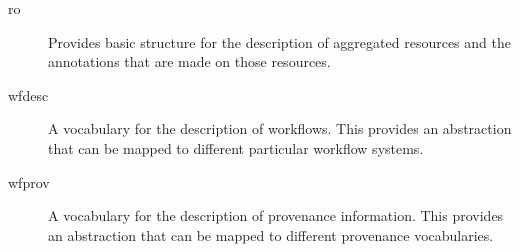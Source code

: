 \begin{description}
\item[ro] Provides basic structure for the description of aggregated
  resources and the annotations that are made on those resources.
\item[wfdesc] A vocabulary for the description of workflows. This
  provides an abstraction that can be mapped to different particular
  workflow systems.
\item[wfprov] A vocabulary for the description of provenance
  information. This provides an abstraction that can be mapped to
  different provenance vocabularies.
\end{description}

